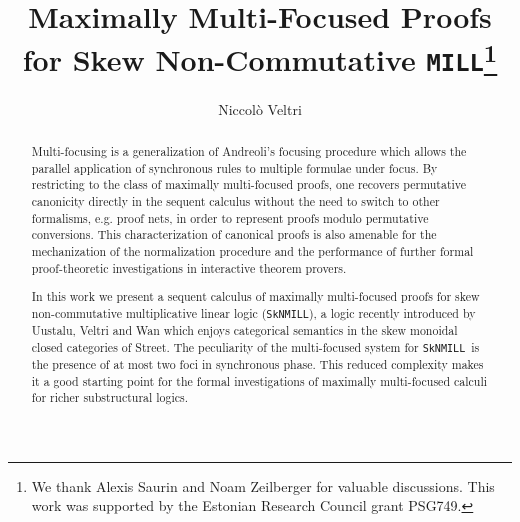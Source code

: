 \documentclass[runningheads]{llncs}
\newcommand{\MILL}{\texttt{MILL}}
\newcommand{\SkNMILL}{\texttt{SkNMILL}}
\begin{document}
\title{Maximally Multi-Focused Proofs for Skew Non-Commutative \MILL\thanks{We thank Alexis Saurin and Noam Zeilberger for valuable discussions. This work was supported by the Estonian Research Council grant PSG749.}}

\author{Niccol{\`o} Veltri}
%
%
\maketitle
%
\begin{abstract}

  Multi-focusing is a generalization of Andreoli's focusing procedure which allows the parallel application of synchronous rules to multiple formulae under focus. By restricting to the class of maximally multi-focused proofs, one recovers permutative canonicity directly in the sequent calculus without the need to switch to other formalisms, e.g. proof nets, in order to  represent proofs modulo permutative conversions. This characterization of canonical proofs is also amenable for the mechanization of the normalization procedure and the performance of further formal proof-theoretic investigations in interactive theorem provers.

  In this work we present a sequent calculus of maximally multi-focused proofs for skew non-commutative multiplicative linear logic (\SkNMILL), a logic recently introduced by Uustalu, Veltri and Wan which enjoys categorical semantics in the skew monoidal closed categories of Street. The peculiarity of the multi-focused system for \SkNMILL\ is the presence of at most two foci in synchronous phase. This reduced complexity makes it a good starting point for the formal investigations of maximally multi-focused calculi for richer substructural logics.
  
\end{abstract}
\end{document}
